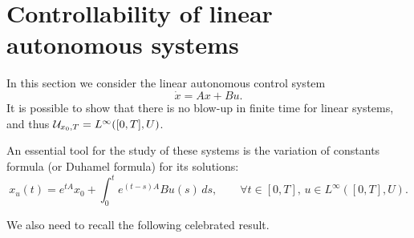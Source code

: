 

\section{Controllability of linear autonomous systems}

In this section we consider the linear autonomous control system
\begin{equation}
    \label{eq:cs-linear}
    \dot x = Ax + Bu.
\end{equation}
It is possible to show that there is no blow-up in finite time for linear systems, and thus $\mathcal{U}_{x_0,T} = L^\infty([0,T], U)$.

An essential tool for the study of these systems is the variation of constants formula (or Duhamel formula) for its solutions:
\begin{equation}
    \label{eq:duhamel-formula}
    x_u(t) = e^{tA}x_0 + \int_0^t e^{(t-s)A}Bu(s)\, ds, 
    \qquad \forall t\in [0,T], \,  u\in L^\infty([0,T], U).
\end{equation}

We also need to recall the following celebrated result.


